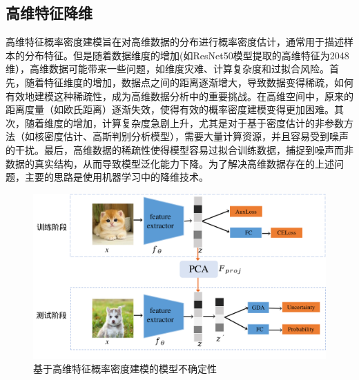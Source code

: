 \subsection{高维特征降维}

高维特征概率密度建模旨在对高维数据的分布进行概率密度估计，通常用于描述样本的分布特征。但是随着数据维度的增加(如ResNet50模型提取的高维特征为2048维），高维数据可能带来一些问题，如维度灾难、计算复杂度和过拟合风险。首先，随着特征维度的增加，数据点之间的距离逐渐增大，导致数据变得稀疏，如何有效地建模这种稀疏性，成为高维数据分析中的重要挑战。在高维空间中，原来的距离度量（如欧氏距离）逐渐失效，使得有效的概率密度建模变得更加困难。其次，随着维度的增加，计算复杂度急剧上升，尤其是对于基于密度估计的非参数方法（如核密度估计、高斯判别分析模型），需要大量计算资源，并且容易受到噪声的干扰。最后，高维数据的稀疏性使得模型容易过拟合训练数据，捕捉到噪声而非数据的真实结构，从而导致模型泛化能力下降。为了解决高维数据存在的上述问题，主要的思路是使用机器学习中的降维技术。


\begin{figure}[h]
    \centering
    \includegraphics[width=1.\linewidth]{assets/structure3.png}
    \caption{基于高维特征概率密度建模的模型不确定性}
    \label{tag:模型结构图3}
\end{figure}


